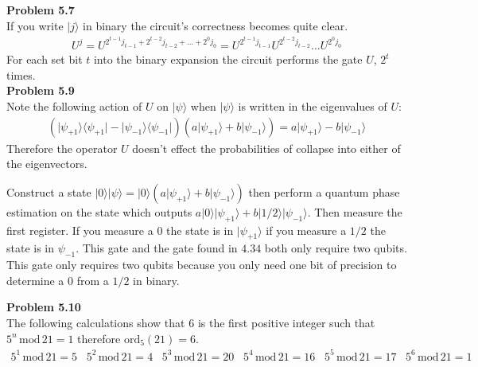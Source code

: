 \documentclass[fleqn]{article}
\newcommand{\problem}[1]{{\large\textbf{Problem #1}}}
\newcommand{\bra}[1]{\ensuremath{\langle #1 |}}
\newcommand{\ket}[1]{\ensuremath{| #1 \rangle}}
\newcommand{\outerF}[2]{\ket{#1} \bra{#2}}
\newcommand{\modF}[2]{\ensuremath{#1 \, \text{mod} \, #2}}
\newcommand{\ordF}[2]{\ensuremath{\text{ord}_{#1}\left( #2 \right)}}
\begin{document}
\problem{5.7} \\
If you write $\ket{j}$ in binary the circuit's correctness becomes quite clear.
\begin{align*}
  U^j = U^{2^{t - 1} j_{t - 1} + 2^{t - 2} j_{t - 2} + \dots + 2^0 j_0}
  = U^{2^{t - 1} j_{t - 1}} U^{2^{t - 2} j_{t - 2}} \dots U^{2^0 j_0}
\end{align*}
For each set bit $t$ into the binary expansion the circuit performs the gate $U$, $2^t$ times. \\

\problem{5.9} \\
Note the following action of $U$ on $\ket{\psi}$ when $\ket{\psi}$ is written in the
eigenvalues of $U$:
\begin{align*}
  \left( \outerF{\psi_{+1}}{\psi_{+1}} - \outerF{\psi_{-1}}{\psi_{-1}} \right) 
  \left( a \ket{\psi_{+1}} + b \ket{\psi_{-1}} \right)
  = a \ket{\psi_{+1}} - b \ket{\psi_{-1}}
\end{align*}
Therefore the operator $U$ doesn't effect the probabilities of collapse into
either of the eigenvectors.

Construct a state
$\ket{0}\ket{\psi} = \ket{0}\left( a \ket{\psi_{+1}} + b \ket{\psi_{-1}} \right)$
then perform a quantum phase estimation on the state which outputs
$a \ket{0} \ket{\psi_{+1}} + b \ket{1/2} \ket{\psi_{-1}}$.
Then measure the first register. If you measure
a $0$ the state is in $\ket{\psi_{+1}}$ if you measure a $1/2$ the state is in $\psi_{-1}$.
This gate and the gate found in $4.34$ both only require two qubits. This gate
only requires two qubits because you only need one bit of precision to determine
a $0$ from a $1/2$ in binary.

\problem{5.10} \\
The following calculations show that $6$ is the first positive integer such that
$\modF{5^n}{21} = 1$ therefore $\ordF{5}{21} = 6$.
\begin{align*}
  \modF{5^1}{21} = 5 \,\,\,\,\,
  \modF{5^2}{21} = 4 \,\,\,\,\,
  \modF{5^3}{21} = 20 \,\,\,\,\,
  \modF{5^4}{21} = 16 \,\,\,\,\,
  \modF{5^5}{21} = 17 \,\,\,\,\,
  \modF{5^6}{21} = 1 \,\,\,\,\,
\end{align*}
\end{document}

